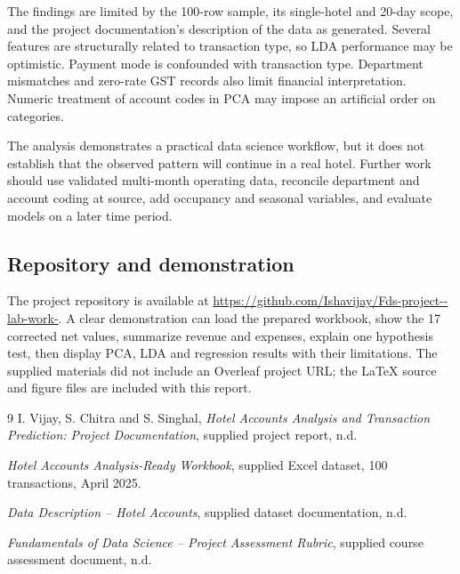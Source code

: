 \documentclass[11pt,a4paper]{article}
\begin{document}
The findings are limited by the 100-row sample, its single-hotel and 20-day scope, and the project documentation's description of the data as generated. Several features are structurally related to transaction type, so LDA performance may be optimistic. Payment mode is confounded with transaction type. Department mismatches and zero-rate GST records also limit financial interpretation. Numeric treatment of account codes in PCA may impose an artificial order on categories.

The analysis demonstrates a practical data science workflow, but it does not establish that the observed pattern will continue in a real hotel. Further work should use validated multi-month operating data, reconcile department and account coding at source, add occupancy and seasonal variables, and evaluate models on a later time period.

\subsection{Repository and demonstration}
The project repository is available at \url{https://github.com/Ishavijay/Fds-project--lab-work-}. A clear demonstration can load the prepared workbook, show the 17 corrected net values, summarize revenue and expenses, explain one hypothesis test, then display PCA, LDA and regression results with their limitations. The supplied materials did not include an Overleaf project URL; the LaTeX source and figure files are included with this report.

\begin{thebibliography}{9}
I. Vijay, S. Chitra and S. Singhal, \textit{Hotel Accounts Analysis and Transaction Prediction: Project Documentation}, supplied project report, n.d.

\textit{Hotel Accounts Analysis-Ready Workbook}, supplied Excel dataset, 100 transactions, April 2025.

\textit{Data Description -- Hotel Accounts}, supplied dataset documentation, n.d.

\textit{Fundamentals of Data Science -- Project Assessment Rubric}, supplied course assessment document, n.d.
\end{thebibliography}
\end{document}
